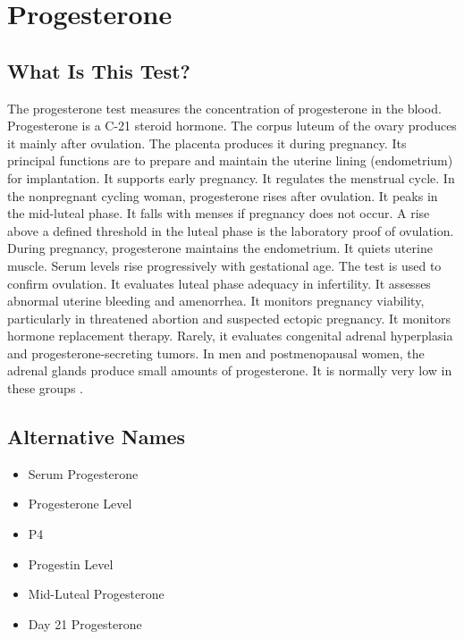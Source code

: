 \chapter{Progesterone}

\section*{What Is This Test?}
The progesterone test measures the concentration of progesterone in the blood. Progesterone is a C-21 steroid hormone. The corpus luteum of the ovary produces it mainly after ovulation. The placenta produces it during pregnancy. Its principal functions are to prepare and maintain the uterine lining (endometrium) for implantation. It supports early pregnancy. It regulates the menstrual cycle. In the nonpregnant cycling woman, progesterone rises after ovulation. It peaks in the mid-luteal phase. It falls with menses if pregnancy does not occur. A rise above a defined threshold in the luteal phase is the laboratory proof of ovulation. During pregnancy, progesterone maintains the endometrium. It quiets uterine muscle. Serum levels rise progressively with gestational age. The test is used to confirm ovulation. It evaluates luteal phase adequacy in infertility. It assesses abnormal uterine bleeding and amenorrhea. It monitors pregnancy viability, particularly in threatened abortion and suspected ectopic pregnancy. It monitors hormone replacement therapy. Rarely, it evaluates congenital adrenal hyperplasia and progesterone-secreting tumors. In men and postmenopausal women, the adrenal glands produce small amounts of progesterone. It is normally very low in these groups \cite{hoffman2020williams}.

\section*{Alternative Names}
\begin{itemize}
  \item Serum Progesterone
  \item Progesterone Level
  \item P4
  \item Progestin Level
  \item Mid-Luteal Progesterone
  \item Day 21 Progesterone
\end{itemize}
